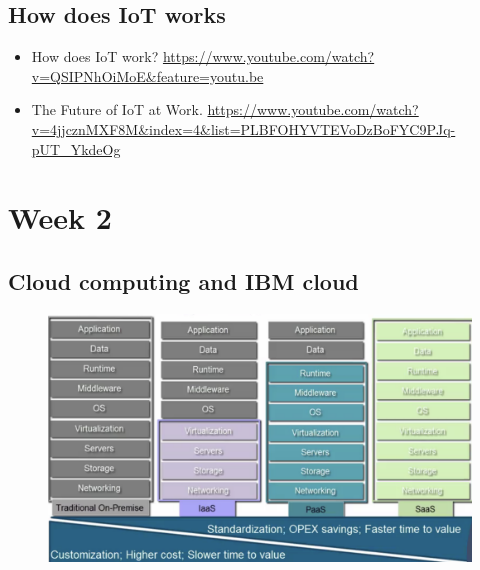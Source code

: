 \documentclass[11pt, twoside]{article}   	%
\begin{document}
\begin{itemize}
\subsection{How does IoT works}
\begin{itemize}
\item How does IoT work?  \url{https://www.youtube.com/watch?v=QSIPNhOiMoE&feature=youtu.be}
\item The Future of IoT at Work.  \url{https://www.youtube.com/watch?v=4jjcznMXF8M&index=4&list=PLBFOHYVTEVoDzBoFYC9PJq-pUT_YkdeOg}
\end{itemize}

\end {itemize}



 \bigskip
\section{Week 2}
\subsection{Cloud computing and IBM cloud}
     \begin{figure}
    [!htb]\centering
    \includegraphics[width=5in]{CloudComputing.png}%
  \label{fig:phase}
  \end{figure}
\end{document}
